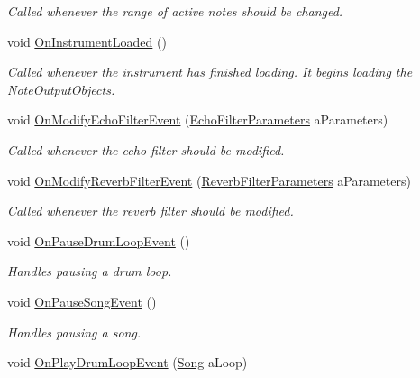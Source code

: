 \begin{DoxyCompactItemize}
\begin{DoxyCompactList}\small\item\em Called whenever the range of active notes should be changed. \end{DoxyCompactList}\item 
void \hyperlink{group___v_i_m_handlers_gac7d5b65484e450a400e32ab416ebc9f6}{On\+Instrument\+Loaded} ()
\begin{DoxyCompactList}\small\item\em Called whenever the instrument has finished loading. It begins loading the Note\+Output\+Objects. \end{DoxyCompactList}\item 
void \hyperlink{group___v_i_m_handlers_gae504c6ded8eb68ffb117c207fc25d99d}{On\+Modify\+Echo\+Filter\+Event} (\hyperlink{group__filter_params_struct_virtual_instrument_manager_1_1_echo_filter_parameters}{Echo\+Filter\+Parameters} a\+Parameters)
\begin{DoxyCompactList}\small\item\em Called whenever the echo filter should be modified. \end{DoxyCompactList}\item 
void \hyperlink{group___v_i_m_handlers_ga2b310217971075b1b2db67d68fbbea5a}{On\+Modify\+Reverb\+Filter\+Event} (\hyperlink{group__filter_params_struct_virtual_instrument_manager_1_1_reverb_filter_parameters}{Reverb\+Filter\+Parameters} a\+Parameters)
\begin{DoxyCompactList}\small\item\em Called whenever the reverb filter should be modified. \end{DoxyCompactList}\item 
void \hyperlink{group___v_i_m_handlers_ga30cd7f00fea55becd6d90f0ec737510a}{On\+Pause\+Drum\+Loop\+Event} ()
\begin{DoxyCompactList}\small\item\em Handles pausing a drum loop. \end{DoxyCompactList}\item 
void \hyperlink{group___v_i_m_handlers_gad052b3cc53b35b25631f9b399be489ae}{On\+Pause\+Song\+Event} ()
\begin{DoxyCompactList}\small\item\em Handles pausing a song. \end{DoxyCompactList}\item 
void \hyperlink{group___v_i_m_handlers_gae2e2010b9a36ae2409466181ae0b9679}{On\+Play\+Drum\+Loop\+Event} (\hyperlink{class_song}{Song} a\+Loop)

\end{DoxyCompactItemize}
